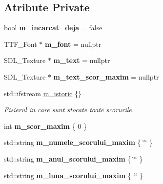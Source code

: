 \subsection*{Atribute Private}
\begin{DoxyCompactItemize}
\item 
\mbox{\label{classMeniuFinal_aedde998b4a8c6b468d7dc1a4c5af4cbc}} 
bool {\bfseries m\+\_\+incarcat\+\_\+deja} = false
\item 
\mbox{\label{classMeniuFinal_a8ca418faf68fa155bc809a325479a02a}} 
T\+T\+F\+\_\+\+Font $\ast$ {\bfseries m\+\_\+font} = nullptr
\item 
\mbox{\label{classMeniuFinal_a79c050764da86c93f5554265a7567036}} 
S\+D\+L\+\_\+\+Texture $\ast$ {\bfseries m\+\_\+text} = nullptr
\item 
\mbox{\label{classMeniuFinal_a3d0af1b8d2ce9ba4e2013ddb68f5786f}} 
S\+D\+L\+\_\+\+Texture $\ast$ {\bfseries m\+\_\+text\+\_\+scor\+\_\+maxim} = nullptr
\item 
std\+::ifstream \hyperlink{classMeniuFinal_a995e013192e1bed67332f0d54ae2b482}{m\+\_\+istoric} \{\}
\begin{DoxyCompactList}\small\item\em Fisierul in care sunt stocate toate scorurile. \end{DoxyCompactList}\item 
\mbox{\label{classMeniuFinal_a9dd63e1fb07a20c48cec529f794945a8}} 
int {\bfseries m\+\_\+scor\+\_\+maxim} \{ 0 \}
\item 
\mbox{\label{classMeniuFinal_a45688213631c7266bb329f301523dfb0}} 
std\+::string {\bfseries m\+\_\+numele\+\_\+scorului\+\_\+maxim} \{ \char`\"{}\char`\"{} \}
\item 
\mbox{\label{classMeniuFinal_aa940eaec12a96d8a9037cd698c5c2baa}} 
std\+::string {\bfseries m\+\_\+anul\+\_\+scorului\+\_\+maxim} \{ \char`\"{}\char`\"{} \}
\item 
\mbox{\label{classMeniuFinal_a17611b8f7fb8442187fced397c26875a}} 
std\+::string {\bfseries m\+\_\+luna\+\_\+scorului\+\_\+maxim} \{ \char`\"{}\char`\"{} \}

\end{DoxyCompactItemize}
